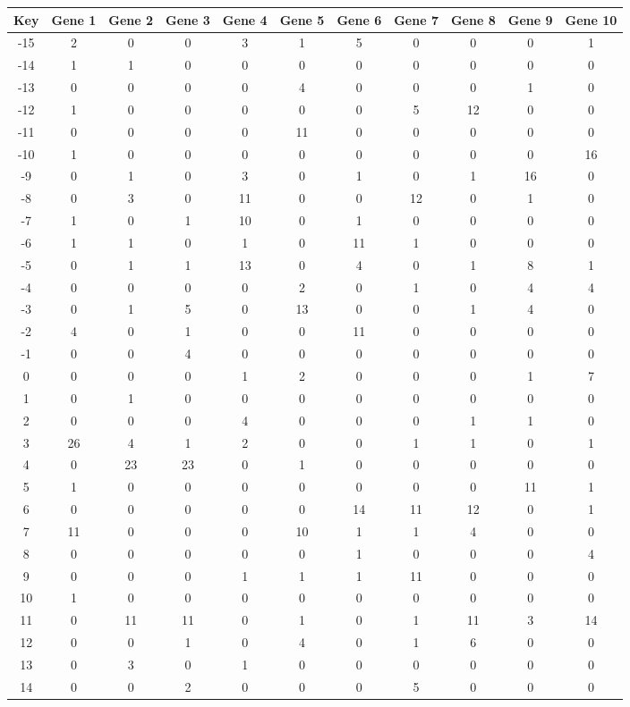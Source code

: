 \begin{tabular}{|c|c|c|c|c|c|c|c|c|c|c|}
\hline
Key & Gene 1 & Gene 2 & Gene 3 & Gene 4 & Gene 5 & Gene 6 & Gene 7 & Gene 8 & Gene 9 & Gene 10 \\
\hline
-15 & 2 & 0 & 0 & 3 & 1 & 5 & 0 & 0 & 0 & 1 \\
-14 & 1 & 1 & 0 & 0 & 0 & 0 & 0 & 0 & 0 & 0 \\
-13 & 0 & 0 & 0 & 0 & 4 & 0 & 0 & 0 & 1 & 0 \\
-12 & 1 & 0 & 0 & 0 & 0 & 0 & 5 & 12 & 0 & 0 \\
-11 & 0 & 0 & 0 & 0 & 11 & 0 & 0 & 0 & 0 & 0 \\
-10 & 1 & 0 & 0 & 0 & 0 & 0 & 0 & 0 & 0 & 16 \\
-9 & 0 & 1 & 0 & 3 & 0 & 1 & 0 & 1 & 16 & 0 \\
-8 & 0 & 3 & 0 & 11 & 0 & 0 & 12 & 0 & 1 & 0 \\
-7 & 1 & 0 & 1 & 10 & 0 & 1 & 0 & 0 & 0 & 0 \\
-6 & 1 & 1 & 0 & 1 & 0 & 11 & 1 & 0 & 0 & 0 \\
-5 & 0 & 1 & 1 & 13 & 0 & 4 & 0 & 1 & 8 & 1 \\
-4 & 0 & 0 & 0 & 0 & 2 & 0 & 1 & 0 & 4 & 4 \\
-3 & 0 & 1 & 5 & 0 & 13 & 0 & 0 & 1 & 4 & 0 \\
-2 & 4 & 0 & 1 & 0 & 0 & 11 & 0 & 0 & 0 & 0 \\
-1 & 0 & 0 & 4 & 0 & 0 & 0 & 0 & 0 & 0 & 0 \\
0 & 0 & 0 & 0 & 1 & 2 & 0 & 0 & 0 & 1 & 7 \\
1 & 0 & 1 & 0 & 0 & 0 & 0 & 0 & 0 & 0 & 0 \\
2 & 0 & 0 & 0 & 4 & 0 & 0 & 0 & 1 & 1 & 0 \\
3 & 26 & 4 & 1 & 2 & 0 & 0 & 1 & 1 & 0 & 1 \\
4 & 0 & 23 & 23 & 0 & 1 & 0 & 0 & 0 & 0 & 0 \\
5 & 1 & 0 & 0 & 0 & 0 & 0 & 0 & 0 & 11 & 1 \\
6 & 0 & 0 & 0 & 0 & 0 & 14 & 11 & 12 & 0 & 1 \\
7 & 11 & 0 & 0 & 0 & 10 & 1 & 1 & 4 & 0 & 0 \\
8 & 0 & 0 & 0 & 0 & 0 & 1 & 0 & 0 & 0 & 4 \\
9 & 0 & 0 & 0 & 1 & 1 & 1 & 11 & 0 & 0 & 0 \\
10 & 1 & 0 & 0 & 0 & 0 & 0 & 0 & 0 & 0 & 0 \\
11 & 0 & 11 & 11 & 0 & 1 & 0 & 1 & 11 & 3 & 14 \\
12 & 0 & 0 & 1 & 0 & 4 & 0 & 1 & 6 & 0 & 0 \\
13 & 0 & 3 & 0 & 1 & 0 & 0 & 0 & 0 & 0 & 0 \\
14 & 0 & 0 & 2 & 0 & 0 & 0 & 5 & 0 & 0 & 0 \\
\hline
\end{tabular}
